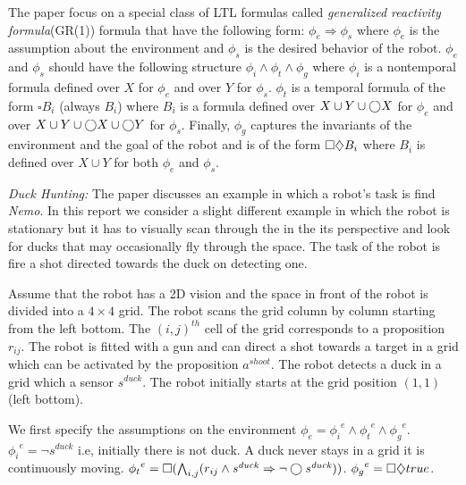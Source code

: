The paper focus on a special class of LTL formulas called \emph{generalized reactivity formula}(GR(1)) formula
that have the following form: $\phi_e \Rightarrow \phi_s$  where $\phi_e$ is the assumption
about the environment and $\phi_s$ is the desired behavior of the robot.
$\phi_e$ and $\phi_s$ should have the following structure $\phi_i \wedge \phi_t \wedge \phi_g$ where
$\phi_i$ is a nontemporal formula defined over $X$ for $\phi_e$ and over $Y$ for $\phi_s$. 
$\phi_t$ is a temporal formula of the form $\square B_i$ (always $B_i$) where $B_i$ is a formula 
defined over $X \cup Y \cup \bigcirc X$ for $\phi_e$ and over $X \cup Y \cup \bigcirc X \cup \bigcirc Y$ for
$\phi_s$. Finally, $\phi_g$ captures the invariants of the environment and the goal of the robot 
and is of the form $\square \diamondsuit B_i$
where $B_i$ is defined over $X \cup Y$ for both $\phi_e$ and $\phi_s$.

\newcommand{\shoot}{\mathit{a^{shoot}}}
\newcommand{\duck}{\mathit{s^{duck}}}
\newcommand{\collect}[1]{\mathit{s^{collect_{#1}}}}

\textit{Duck Hunting:} The paper discusses an example in which a robot's task is find \emph{Nemo}.
In this report we consider a slight different example in which the robot is stationary but
it has to visually scan through the in the its perspective and look for ducks that may occasionally 
fly through the space. The task of the robot is fire a shot directed towards the duck on detecting one.

Assume that the robot has a 2D vision and the space in front of the robot is divided into a $4 \times 4$ grid.
The robot scans the grid column by column starting from the left bottom. 
The $(i,j)^{th}$ cell of the grid corresponds to a proposition $r_{ij}$.
The robot is fitted with a gun and can direct a shot towards a target in a grid which can be activated 
by the proposition $\shoot$. The robot detects a duck in a grid which a sensor $\duck$.
The robot initially starts at the grid position $(1,1)$ (left bottom).

We first specify the assumptions on the environment $\phi_e = {\phi_i}^e \wedge {\phi_t}^e \wedge {\phi_g}^e$.
${\phi_i}^e = \neg \duck$ i.e, initially there is not duck. 
A duck never stays in a grid it is continuously moving.
${\phi_t}^e = \always ( \bigwedge_{i,j} (r_{ij} \wedge \duck \Rightarrow \neg \next \duck))$.
${\phi_g}^e = \square \diamondsuit true$.

